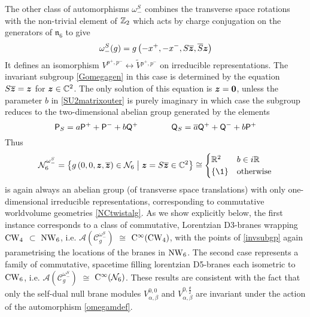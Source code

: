 The other class of automorphisms $\omega_-^S$ combines the transverse space
rotations with the non-trivial element of ${\mathbb Z}_2$ which acts by charge
conjugation on the generators of $\mathfrak{n}_6$ to give
\begin{equation}
  \label{omegamdef}
  \omega_-^S(g)=g\left(-x^+,-x^-,S \overline{{{\boldsymbol {z} }}},\overline{S} {{\boldsymbol {z} }} \right)
\end{equation}
It defines an isomorphism $V^{p^+,p^-}\leftrightarrow\widetilde{V}{}^{p^+,p^-}$
on irreducible representations. The invariant subgroup \eqref{Gomegagen} in this
case is determined by the equation $S \overline{{{\boldsymbol {z} }}}={{\boldsymbol {z} }}$ for
${{\boldsymbol {z} }}\in{\mathbb C}^2$. The only solution of this equation is ${{\boldsymbol {z} }}={\boldsymbol {0} }$, unless
the parameter $b$ in \eqref{SU2matrixouter} is purely imaginary in which case
the subgroup reduces to the two-dimensional abelian group generated by the
elements
\begin{equation}
  \label{2Dabgp}
  {\sf P}_S=a {\sf P}^++{\sf P}^-+b {\sf Q}^+ \qquad\qquad
  {\sf Q}_S=\overline{a} {\sf Q}^++{\sf Q}^-+b {\sf P}^+
\end{equation}
Thus
\begin{equation}
  \label{invsubgp}
  \mathcal{N}_6^{ \omega_-^S} = \bigl\{g\left(0,0,\mz,\overline{\mz} \right)
  \in\mathcal{N}_6 \bigm| \mz=S \overline{\mz}\in\C^2\bigr\} \cong
  \begin{cases}
    \R^2  &b\in i\R\\
    \{\1\}  &{\rm otherwise}
  \end{cases}
\end{equation}
is again always an abelian group (of transverse space translations) with only
one-dimensional irreducible representations, corresponding to commutative
worldvolume geometries \eqref{NCtwistalg}. As we show explicitly below, the
first instance corresponds to a class of commutative, Lorentzian D3-branes
wrapping $\operatorname{CW}_4$ $\subset$ $\operatorname{NW}_6$, i.e.
$\mathcal{A}(\mathcal{C}_g^{\omega_-^S})$ $\cong$ ${\rm C}^\infty(\operatorname{CW}_4)$, with
the points of \eqref{invsubgp} again parametrising the locations of the branes
in $\operatorname{NW}_6$. The second case represents a family of commutative, spacetime
filling lorentzian D5-branes each isometric to $\operatorname{CW}_6$, i.e.
$\mathcal{A}(\mathcal{C}_g^{\omega_-^S})$ $\cong$ ${\rm
  C}^\infty(\mathcal{N}_6)$. These results are consistent with the fact that
only the self-dual null brane modules $V_{\alpha,\beta}^{0,0}$ and
$V_{\alpha,\beta}^{0,\frac\theta2}$ are invariant under the action of the
automorphism \eqref{omegamdef}.

